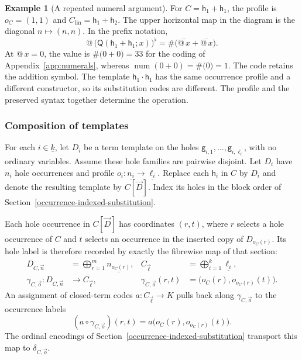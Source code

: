 \documentclass[11pt]{article}
\makeatletter
\newcommand{\atsign}{\mathord{@}}
\newcommand{\finord}[1]{\underline{#1}}
\newcommand{\num}{\operatorname{num}}
\newcommand{\Q}{\mathsf Q}
\newcommand{\h}{\mathsf h}
\newcommand{\code}[1]{\#\bigl(#1\bigr)}
\newcommand{\flatof}[1]{\bigl(#1\bigr)^{\flat}}
\theoremstyle{definition}
\newtheorem{example}[proposition]{Example}
\makeatother
\begin{document}
\begin{example}[A repeated numeral argument]
For $C=\h_1+\h_1$, the profile is $o_C=(1,1)$ and
$C_{\mathrm{lin}}=\h_1+\h_2$. The upper horizontal map in the diagram
is the diagonal $n\mapsto(n,n)$. In the prefix notation,
\[
 \atsign\,\flatof{\Q(\h_1+\h_1;x)}
   =\code{\overline{\atsign\,x}+\overline{\atsign\,x}}.
\]
At $\atsign\,x=0$, the value is $\code{0+0}=33$ for the coding of
Appendix~\ref{app:numerals}, whereas $\num(0+0)=\code0=1$.
The code retains the addition symbol. The template $\h_1\cdot\h_1$
has the same occurrence profile and a different constructor, so its
substitution codes are different. The profile and the preserved syntax
together determine the operation.
\end{example}

\subsubsection*{Composition of templates}
For each $i\in\finord k$, let $D_i$ be a term template on the holes
$\mathsf g_{i,1},\ldots,\mathsf g_{i,\ell_i}$, with no ordinary
variables. Assume these hole families are pairwise disjoint. Let $D_i$
have $n_i$ hole occurrences and profile
$o_i:\finord{n_i}\to\finord{\ell_i}$.
Replace each $\h_i$ in $C$ by $D_i$ and denote the resulting template
by $C[\vec D]$. Index its holes in the block order of
Section~\ref{occurrence-indexed-substitution}.

Each hole occurrence in $C[\vec D]$ has coordinates $(r,t)$, where $r$
selects a hole occurrence of $C$ and $t$ selects an occurrence in the
inserted copy of $D_{o_C(r)}$. Its hole label is therefore recorded by
exactly the fibrewise map of that section:
\[
\begin{aligned}
 D_{C,\vec n}
   &=\bigoplus_{r=1}^{m}\finord{n_{o_C(r)}},
 &C_{\vec\ell}&=\bigoplus_{i=1}^{k}\finord{\ell_i},\\
 \gamma_{C,\vec o}:D_{C,\vec n}&\longrightarrow C_{\vec\ell},
 &\gamma_{C,\vec o}(r,t)&=
       \bigl(o_C(r),o_{o_C(r)}(t)\bigr).
\end{aligned}
\]
An assignment of closed-term codes $a:C_{\vec\ell}\to K$ pulls back
along $\gamma_{C,\vec o}$ to the occurrence labels
\[
 (a\circ\gamma_{C,\vec o})(r,t)
   =a\bigl(o_C(r),o_{o_C(r)}(t)\bigr).
\]
The ordinal encodings of Section~\ref{occurrence-indexed-substitution}
transport this map to $\delta_{C,\vec o}$.
\end{document}
